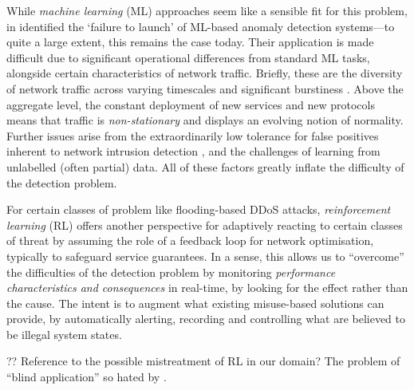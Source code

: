 \documentclass[conference, letterpaper, 10pt, times]{IEEEtran}
\begin{document}
While \emph{machine learning} (ML) approaches seem like a sensible fit for this problem, in \citeyear{DBLP:conf/sp/SommerP10} \textcite{DBLP:conf/sp/SommerP10} identified the `failure to launch' of ML-based anomaly detection systems---to quite a large extent, this remains the case today.
Their application is made difficult due to significant operational differences from standard ML tasks, alongside certain characteristics of network traffic.
Briefly, these are the diversity of network traffic across varying timescales \cite{DBLP:conf/sp/SommerP10} and significant burstiness \cite{DBLP:journals/ccr/LelandWTW95}.
Above the aggregate level, the constant deployment of new services and new protocols means that traffic is \emph{non-stationary} and displays an evolving notion of normality.
Further issues arise from the extraordinarily low tolerance for false positives inherent to network intrusion detection \cite{DBLP:conf/ccs/Axelsson99}, and the challenges of learning from unlabelled (often partial) data.
All of these factors greatly inflate the difficulty of the detection problem.

For certain classes of problem like flooding-based DDoS attacks, \emph{reinforcement learning} (RL) offers another perspective for adaptively reacting to certain classes of threat by assuming the role of a feedback loop for network optimisation, typically to safeguard service guarantees.
In a sense, this allows us to ``overcome'' the difficulties of the detection problem by monitoring \emph{performance characteristics and consequences} in real-time, by looking for the effect rather than the cause.
The intent is to augment what existing misuse-based solutions can provide, by automatically alerting, recording and controlling what are believed to be illegal system states.

?? Reference to the possible mistreatment of RL in our domain? The problem of ``blind application'' so hated by \textcite{DBLP:conf/sp/SommerP10}.
\end{document}

